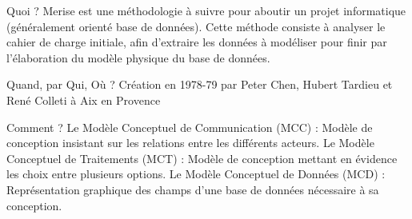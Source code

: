 \documentclass{beamer}
\begin{document}
    \begin{frame}
        Quoi ?
    \newline
    \newline
        Merise est une méthodologie à suivre pour aboutir un projet informatique (généralement orienté base de données).
    \newline
    \newline
        Cette méthode consiste à analyser le cahier de charge initiale,
        afin d'extraire les données à modéliser pour finir par l'élaboration du modèle physique du base de données.
    \end{frame}

    \begin{frame}
        Quand, par Qui, Où ?
        \newline
        \newline
        Création en 1978-79 par Peter Chen, Hubert Tardieu et René Colleti à Aix en Provence
    \end{frame}

    \begin{frame}

        Comment ?
    \newline
    \newline
        Le Modèle Conceptuel de Communication (MCC) :
    \newline
        Modèle de conception insistant sur les relations entre les différents acteurs.
    \newline
    \newline
        Le Modèle Conceptuel de Traitements (MCT) :
    \newline
        Modèle de conception mettant en évidence les choix entre plusieurs options.
    \newline
    \newline
        Le Modèle Conceptuel de Données (MCD) :
    \newline
        Représentation graphique des champs d'une base de données nécessaire à sa conception.

    \end{frame}
\end{document}
